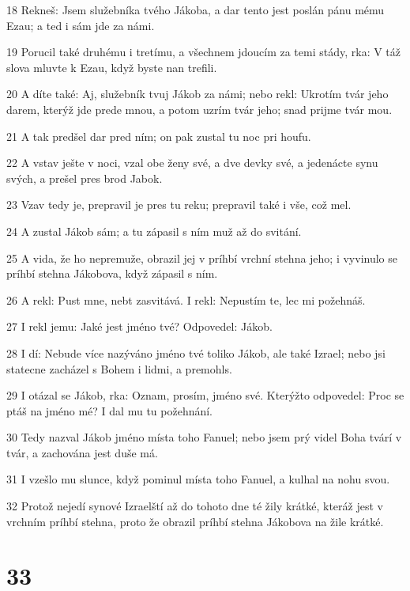 \par 18 Rekneš: Jsem služebníka tvého Jákoba, a dar tento jest poslán pánu mému Ezau; a ted i sám jde za námi.
\par 19 Porucil také druhému i tretímu, a všechnem jdoucím za temi stády, rka: V táž slova mluvte k Ezau, když byste nan trefili.
\par 20 A díte také: Aj, služebník tvuj Jákob za námi; nebo rekl: Ukrotím tvár jeho darem, kterýž jde prede mnou, a potom uzrím tvár jeho; snad prijme tvár mou.
\par 21 A tak predšel dar pred ním; on pak zustal tu noc pri houfu.
\par 22 A vstav ješte v noci, vzal obe ženy své, a dve devky své, a jedenácte synu svých, a prešel pres brod Jabok.
\par 23 Vzav tedy je, prepravil je pres tu reku; prepravil také i vše, což mel.
\par 24 A zustal Jákob sám; a tu zápasil s ním muž až do svitání.
\par 25 A vida, že ho nepremuže, obrazil jej v príhbí vrchní stehna jeho; i vyvinulo se príhbí stehna Jákobova, když zápasil s ním.
\par 26 A rekl: Pust mne, nebt zasvitává. I rekl: Nepustím te, lec mi požehnáš.
\par 27 I rekl jemu: Jaké jest jméno tvé? Odpovedel: Jákob.
\par 28 I dí: Nebude více nazýváno jméno tvé toliko Jákob, ale také Izrael; nebo jsi statecne zacházel s Bohem i lidmi, a premohls.
\par 29 I otázal se Jákob, rka: Oznam, prosím, jméno své. Kterýžto odpovedel: Proc se ptáš na jméno mé? I dal mu tu požehnání.
\par 30 Tedy nazval Jákob jméno místa toho Fanuel; nebo jsem prý videl Boha tvárí v tvár, a zachována jest duše má.
\par 31 I vzešlo mu slunce, když pominul místa toho Fanuel, a kulhal na nohu svou.
\par 32 Protož nejedí synové Izraelští až do tohoto dne té žily krátké, kteráž jest v vrchním príhbí stehna, proto že obrazil príhbí stehna Jákobova na žile krátké.

\chapter{33}

